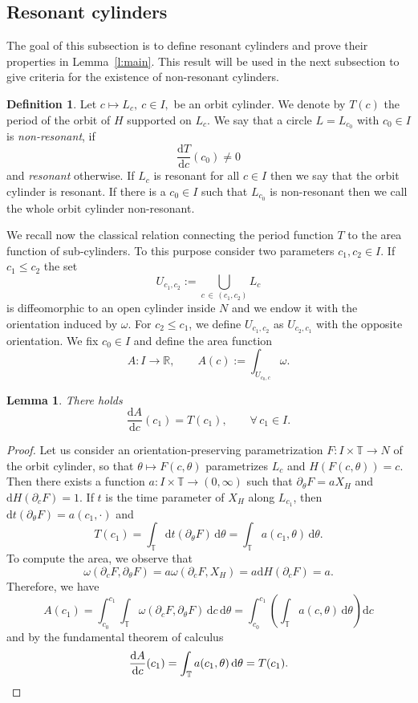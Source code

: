 \documentclass[10pt]{amsart}
\newtheorem{lemm}[cdrthm]{Lemma}
\theoremstyle{definition}
\newtheorem{defi}[cdrthm]{Definition}
\newcommand{\R}{\mathbb{R}}
\newcommand{\T}{\mathbb{T}}
\newcommand{\diff}{\mathrm{d}}
\newcommand{\p}{\partial}
\let\oldforall\forall
\renewcommand*{\forall}{\mathrel{\oldforall}}
\begin{document}
\subsection{Resonant cylinders}\label{ss:res}
The goal of this subsection is to define resonant cylinders and prove their properties in Lemma~\ref{l:main}. This result will be used in the next subsection to give criteria for the existence of non-resonant cylinders.

\begin{defi}
Let $c\mapsto L_c, \ c\in I,$ be an orbit cylinder. We denote by $T(c)$ the period of the orbit of $H$ supported on $L_c$. We say that a circle $L=L_{c_0}$ with $c_0\in I$ is \emph{non-resonant}, if
\[
\frac{\diff T}{\diff c}(c_0)\neq0
\]
and \emph{resonant} otherwise. If $L_c$ is resonant for all $c\in I$ then we say that the orbit cylinder is resonant. If there is a $c_0\in I$ such that $L_{c_0}$ is non-resonant then we call the whole orbit cylinder non-resonant.
\end{defi}

We recall now the classical relation connecting the period function $T$ to the area function of sub-cylinders. To this purpose consider two parameters $c_1,c_2\in I$. If $c_1\leq c_2$ the set
\[
U_{c_1,c_2}:=\bigcup_{c\,\in\,\left(c_1,c_2\right)}L_c
\]
is diffeomorphic to an open cylinder inside $N$ and we endow it with the orientation induced by $\omega$. For $c_2\leq c_1$, we define $U_{c_1,c_2}$ as $U_{c_2,c_1}$ with the opposite orientation. We fix $c_0\in I$ and define the area function
\[
A:I\to\R,\qquad A(c):=\int_{U_{c_0,c}}\omega.
\]

\begin{lemm}\label{l:ap}
There holds
\[
\frac{\diff A}{\diff c}(c_1)=T(c_1),\qquad\forall\,c_1\in I.
\]
\end{lemm}

\begin{proof}
Let us consider an orientation-preserving parametrization $F:I\times\T\to N$ of the orbit cylinder, so that $\theta\mapsto F(c,\theta)$ parametrizes $L_c$ and $H(F(c,\theta))=c$. Then there exists a function $a:I\times\T\to(0,\infty)$ such that $\p_\theta F=aX_H$ and $\diff H(\p_c F)=1$. If $t$ is the time parameter of $X_H$ along $L_{c_1}$, then $\diff t(\p_\theta F)=a(c_1,\cdot)$ and
\[
T(c_1)=\int_{\T}\diff t\!\left(\p_\theta F\right)\,\diff\theta=\int_{\T}a\!\left(c_1,\theta\right)\,\diff\theta.
\]
To compute the area, we observe that
\[
\omega\!\left(\p_c F,\p_\theta F\right)=a\omega\!\left(\p_c F,X_H\right)=a\diff H\!\left(\p_c F\right)=a.
\]
Therefore, we have
\[
A(c_1)=\int_{c_0}^{c_1}\int_{\T}\omega\!\left(\p_c F,\p_\theta F\right)\,\diff c\,\diff\theta=\int_{c_0}^{c_1}\left(\int_{\T}a\!\left(c,\theta\right)\,\diff\theta\right)\diff c
\]
and by the fundamental theorem of calculus
\[
\frac{\diff A}{\diff c}(c_1)=\int_\T a(c_1,\theta)\,\diff\theta=T(c_1).\qedhere
\]
\end{proof}
\end{document}
